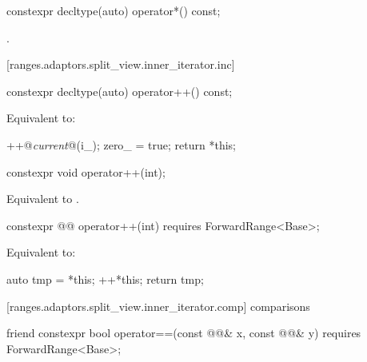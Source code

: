 %
\begin{itemdecl}
constexpr decltype(auto) operator*() const;
\end{itemdecl}

\begin{itemdescr}
\pnum
\returns {}.
\end{itemdescr}

[ranges.adaptors.split_view.inner_iterator.inc]{}

%
\begin{itemdecl}
constexpr decltype(auto) operator++() const;
\end{itemdecl}

\begin{itemdescr}
\pnum
\effects Equivalent to:
\begin{codeblock}
++@\textit{current}@(i_);
zero_ = true;
return *this;
\end{codeblock}
\end{itemdescr}

%
\begin{itemdecl}
constexpr void operator++(int);
\end{itemdecl}

\begin{itemdescr}
\pnum
\effects Equivalent to .
\end{itemdescr}

%
\begin{itemdecl}
constexpr @@ operator++(int) requires ForwardRange<Base>;
\end{itemdecl}

\begin{itemdescr}
\pnum
\effects Equivalent to:
\begin{codeblock}
auto tmp = *this;
++*this;
return tmp;
\end{codeblock}
\end{itemdescr}

[ranges.adaptors.split_view.inner_iterator.comp]{ comparisons}

%
\begin{itemdecl}
friend constexpr bool operator==(const @@& x, const @@& y)
  requires ForwardRange<Base>;
\end{itemdecl}

